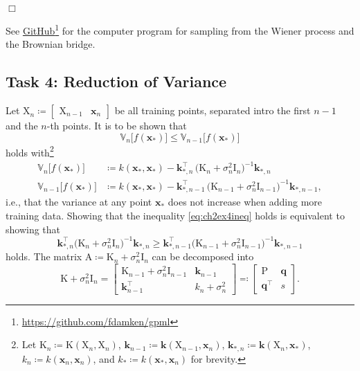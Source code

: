 \documentclass[11pt, a4paper]{scrartcl}
\newcommand{\Var}{\mathbb{V}}
\newcommand{\transposed}{{\!\top\!}}
\renewcommand{\vec}[1]{\bm{#1}}
\newcommand{\mat}[1]{\bm{\mathrm{#1}}}
\newcommand{\qed}{\hfill\(\Box\)}
\newcommand{\github}{\href{https://github.com/fdamken/gpml}{GitHub}\footnote{\url{https://github.com/fdamken/gpml}}\xspace}
\newcommand{\task}[2]{\subsection*{Task #1: #2}}
\begin{document}
			\qed

			See \github for the computer program for sampling from the Wiener process and the Brownian bridge.

		\task{4}{Reduction of Variance}
			Let \( \mat{X}_n \coloneqq \begin{bmatrix} \mat{X}_{n - 1} & \vec{x}_n \end{bmatrix} \) be all training points, separated intro the first \(n - 1\) and the \(n\)-th points. It is to be shown that
			\begin{equation}
				\Var_n\big[ f(\vec{x}_\ast) \big] \leq \Var_{n - 1}\big[ f(\vec{x}_\ast) \big]  \label{eq:ch2ex4ineq}
			\end{equation}
			holds with\footnote{Let \( \mat{K}_n \coloneqq \mat{K}(\mat{X}_n, \mat{X}_n) \), \( \vec{k}_{n - 1} \coloneqq \vec{k}(\mat{X}_{n - 1}, \vec{x}_n) \), \( \vec{k}_{\ast, n} \coloneqq \vec{k}(\mat{X}_n, \vec{x}_\ast) \), \( k_n \coloneqq k(\vec{x}_n, \vec{x}_n) \), and \( k_\ast \coloneqq k(\vec{x}_\ast, \vec{x}_n) \) for brevity.}
			\begin{align}
				\Var_n\big[ f(\vec{x}_\ast) \big]
					&\coloneqq k(\vec{x}_\ast, \vec{x}_\ast) - \vec{k}_{\ast, n}^\transposed \, \big( \mat{K}_n + \sigma_n^2 \mat{I}_n \big)^{-1} \vec{k}_{\ast, n} \\
				\Var_{n - 1}\big[ f(\vec{x}_\ast) \big]
					&\coloneqq k(\vec{x}_\ast, \vec{x}_\ast) - \vec{k}_{\ast, n - 1}^\transposed \, \big( \mat{K}_{n - 1} + \sigma_n^2 \mat{I}_{n - 1} \big)^{-1} \vec{k}_{\ast, n - 1},
			\end{align}
			i.e., that the variance at any point \( \vec{x}_\ast \) does not increase when adding more training data. Showing that the inequality \eqref{eq:ch2ex4ineq} holds is equivalent to showing that
			\begin{equation}
				\vec{k}_{\ast, n}^\transposed \big( \mat{K}_n + \sigma_n^2 \mat{I}_n \big)^{-1} \vec{k}_{\ast, n}
				\geq
				\vec{k}_{\ast, n - 1}^\transposed \big( \mat{K}_{n - 1} + \sigma_n^2 \mat{I}_{n - 1} \big)^{-1} \vec{k}_{\ast, n - 1}
				\label{eq:ch2ex4ineq2}
			\end{equation}
			holds. The matrix \( \mat{A} \coloneqq \mat{K}_n + \sigma_n^2 \mat{I}_n \) can be decomposed into
			\begin{equation}
				\mat{K} + \sigma_n^2 \mat{I}_n =
					\begin{bmatrix}
						\mat{K}_{n - 1} + \sigma_n^2 \mat{I}_{n - 1} & \vec{k}_{n - 1} \\
						\vec{k}_{n - 1}^\transposed                  & k_n + \sigma_n^2
					\end{bmatrix}
				\eqqcolon
					\begin{bmatrix}
						\mat{P}             & \vec{q} \\
						\vec{q}^\transposed & s
					\end{bmatrix}\!.
			\end{equation}
\end{document}
